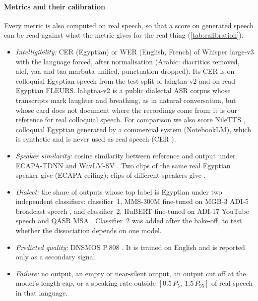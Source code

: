 \paragraph{Metrics and their calibration}
Every metric is also computed on real speech, so that a score on generated speech can be read against what the
metric gives for the real thing (\cref{tab:calibration}).
\begin{itemize}[leftmargin=*]
  \item \emph{Intelligibility:} CER (Egyptian) or WER (English, French) of Whisper large-v3 \citep{radford2023whisper}
  with the language forced, after normalisation (Arabic: diacritics removed, alef, yaa and taa marbuta unified,
  punctuation dropped). Its CER is  on colloquial Egyptian speech from the test split of
  lahgtna-v2 \citep{oddadmix2026lahgtnadata} and  on read Egyptian FLEURS. lahgtna-v2 is a public
  dialectal ASR corpus whose transcripts mark laughter and breathing, as in natural conversation, but whose card does
  not document where the recordings come from; it is our reference for real colloquial speech. For comparison we also
  score NileTTS \citep{khamis2026niletts}, colloquial Egyptian generated by a commercial system (NotebookLM), which is
  synthetic and is never used as real speech (CER ).
  \item \emph{Speaker similarity:} cosine similarity between reference and output under ECAPA-TDNN
  \citep{desplanques2020ecapa,speechbrain2021ecapavoxceleb} and WavLM-SV \citep{chen2022wavlm,microsoft2022wavlmsv}. Two clips of
  the same real Egyptian speaker give  (ECAPA ceiling); clips of different speakers give
  .
  \item \emph{Dialect:} the share of outputs whose top label is Egyptian under two independent classifiers:
  classifier~1, MMS-300M fine-tuned on MGB-3 ADI-5 broadcast speech \citep{abdullah2025tamyizcard,pratap2024mms}, and
  classifier~2, HuBERT fine-tuned on ADI-17 YouTube speech and QASR MSA \citep{ibrahimamin2025hubertadi}. Classifier~2
  was added after the bake-off, to test whether the dissociation depends on one model.
  \item \emph{Predicted quality:} DNSMOS P.808 \citep{reddy2021dnsmos}. It is trained on English and is reported
  only as a secondary signal.
  \item \emph{Failure:} no output, an empty or near-silent output, an output cut off at the model's length cap, or
  a speaking rate outside $[0.5\,P_5,\ 1.5\,P_{95}]$ of real speech in that language.
\end{itemize}

